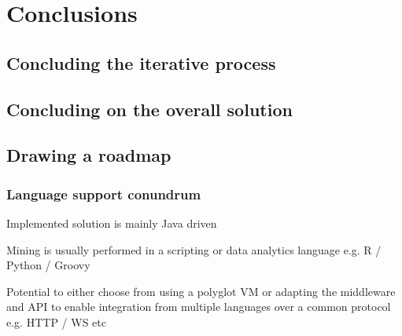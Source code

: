 \chapter{Conclusions}

\section{Concluding the iterative process}

\section{Concluding on the overall solution}






\section{Drawing a roadmap}


\subsection{Language support conundrum}

Implemented solution is mainly Java driven

Mining is usually performed in a scripting or data analytics language e.g. R / Python / Groovy

Potential to either choose from using a polyglot VM or adapting the middleware and API to enable integration from multiple languages over a common protocol e.g. HTTP / WS etc

